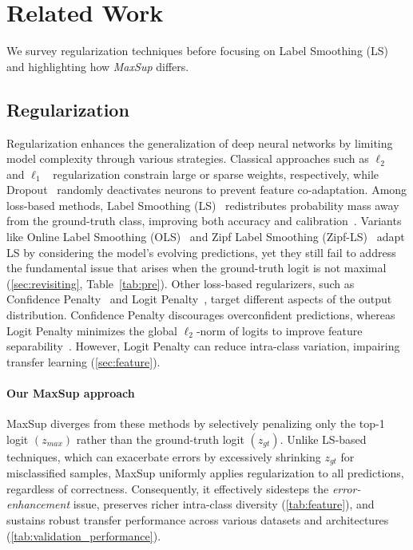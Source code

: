 \section{Related Work}
We survey regularization techniques before focusing on Label Smoothing (LS) and highlighting how \emph{MaxSup} differs.

\subsection{Regularization}
Regularization enhances the generalization of deep neural networks by limiting model complexity through various strategies. Classical approaches such as $\ell_2$~\citep{krogh1991simple} and $\ell_1$~\citep{zou2005regularization} regularization constrain large or sparse weights, respectively, while Dropout~\citep{Srivastava2014} randomly deactivates neurons to prevent feature co-adaptation. Among loss-based methods, Label Smoothing (LS)~\citep{szegedy2016rethinking} redistributes probability mass away from the ground-truth class, improving both accuracy and calibration~\citep{muller2019does}. Variants like Online Label Smoothing (OLS)~\citep{zhang2021delving} and Zipf Label Smoothing (Zipf-LS)~\citep{liang2022efficient} adapt LS by considering the model’s evolving predictions, yet they still fail to address the fundamental issue that arises when the ground-truth logit is not maximal (\cref{sec:revisiting}, Table~\ref{tab:pre}).
Other loss-based regularizers, such as Confidence Penalty~\citep{pereyra2017regularizing} and Logit Penalty~\citep{dauphin2021deconstructing}, target different aspects of the output distribution. Confidence Penalty discourages overconfident predictions, whereas Logit Penalty minimizes the global $\ell_2$-norm of logits to improve feature separability~\citep{kornblith2021better}. However, Logit Penalty can reduce intra-class variation, impairing transfer learning (\cref{sec:feature}).

\paragraph{Our MaxSup approach}  
MaxSup diverges from these methods by selectively penalizing only the top-1 logit \((z_{\textit{max}})\) rather than the ground-truth logit \((z_{gt})\). Unlike LS-based techniques, which can exacerbate errors by excessively shrinking \(z_{gt}\) for misclassified samples, MaxSup uniformly applies regularization to all predictions, regardless of correctness. Consequently, it effectively sidesteps the \emph{error-enhancement} issue, preserves richer intra-class diversity (\cref{tab:feature}), and sustains robust transfer performance across various datasets and architectures (\cref{tab:validation_performance}).


